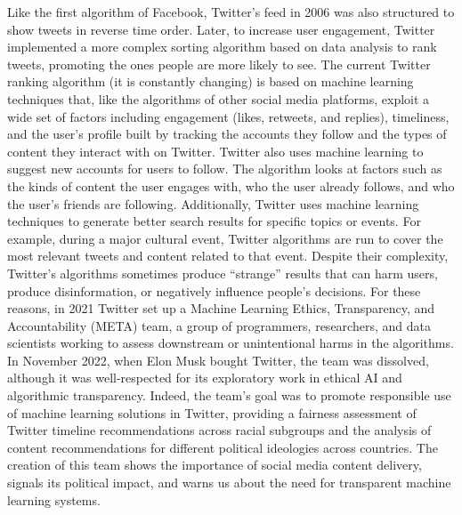 Like the first algorithm of Facebook, Twitter's feed in 2006 was also structured to show tweets in reverse time order. Later, to increase user engagement, Twitter implemented a more complex sorting algorithm based on data analysis to rank tweets, promoting the ones people are more likely to see. The current Twitter ranking algorithm (it is constantly changing) is based on machine learning techniques that, like the algorithms of other social media platforms, exploit a wide set of factors including engagement (likes, retweets, and replies), timeliness, and the user's profile built by tracking the accounts they follow and the types of content they interact with on Twitter. Twitter also uses machine learning to suggest new accounts for users to follow. The algorithm looks at factors such as the kinds of content the user engages with, who the user already follows, and who the user's friends are following. Additionally, Twitter uses machine learning techniques to generate better search results for specific topics or events. For example, during a major cultural event, Twitter algorithms are run to cover the most relevant tweets and content related to that event. Despite their complexity, Twitter's algorithms sometimes produce ``strange'' results that can harm users, produce disinformation, or negatively influence people's decisions. For these reasons, in 2021 Twitter set up a Machine Learning Ethics, Transparency, and Accountability (META) team, a group of programmers, researchers, and data scientists working to assess downstream or unintentional harms in the algorithms. In November 2022, when Elon Musk bought Twitter, the team was dissolved, although it was well-respected for its exploratory work in ethical AI and algorithmic transparency. Indeed, the team's goal was to promote responsible use of machine learning solutions in Twitter, providing a fairness assessment of Twitter timeline recommendations across racial subgroups and the analysis of content recommendations for different political ideologies across countries. The creation of this team shows the importance of social media content delivery, signals its political impact, and warns us about the need for transparent machine learning systems.

